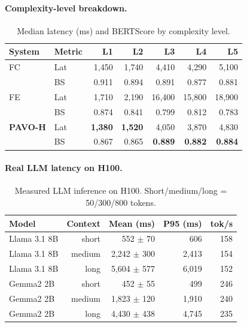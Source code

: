 \documentclass{article}
\begin{document}
\paragraph{Complexity-level breakdown.}

\begin{table}[H]
\centering
\caption{Median latency (ms) and BERTScore by complexity level.}
\label{tab:complexity}
\small
\begin{tabular}{llrrrrr}
\toprule
System & Metric & L1 & L2 & L3 & L4 & L5 \\
\midrule
FC  & Lat & 1{,}450 & 1{,}740 & 4{,}410 & 4{,}290 & 5{,}100 \\
    & BS  & 0.911 & 0.894 & 0.891 & 0.877 & 0.881 \\
FE  & Lat & 1{,}710 & 2{,}190 & 16{,}400 & 15{,}800 & 18{,}900 \\
    & BS  & 0.874 & 0.841 & 0.799 & 0.812 & 0.783 \\
\textbf{PAVO-H} & Lat & \textbf{1{,}380} & \textbf{1{,}520} & 4{,}050 & 3{,}870 & 4{,}830 \\
    & BS  & 0.867 & 0.865 & \textbf{0.889} & \textbf{0.882} & \textbf{0.884} \\
\bottomrule
\end{tabular}
\end{table}

\paragraph{Real LLM latency on H100.}

\begin{table}[H]
\centering
\caption{Measured LLM inference on H100. Short/medium/long = 50/300/800 tokens.}
\label{tab:real_llm}
\small
\begin{tabular}{lrrrr}
\toprule
Model & Context & Mean (ms) & P95 (ms) & tok/s \\
\midrule
Llama 3.1 8B & short & 552 $\pm$ 70 & 606 & 158 \\
Llama 3.1 8B & medium & 2{,}242 $\pm$ 300 & 2{,}413 & 154 \\
Llama 3.1 8B & long & 5{,}604 $\pm$ 577 & 6{,}019 & 152 \\
Gemma2 2B & short & 452 $\pm$ 55 & 499 & 246 \\
Gemma2 2B & medium & 1{,}823 $\pm$ 120 & 1{,}910 & 240 \\
Gemma2 2B & long & 4{,}430 $\pm$ 438 & 4{,}745 & 235 \\
\bottomrule
\end{tabular}
\end{table}
\end{document}
